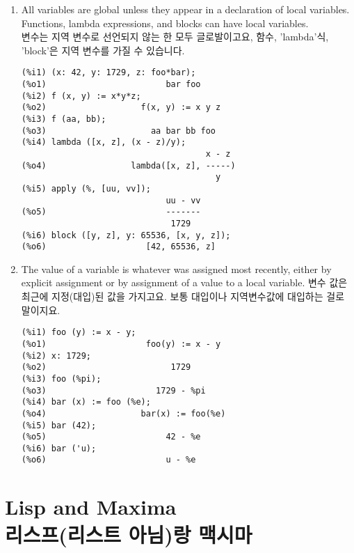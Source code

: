 \documentclass[12pt]{article}
\begin{document}
\begin{enumerate}

\item All variables are global unless they appear in a declaration of local variables.
Functions, lambda expressions, and blocks can have local variables. \\
변수는 지역 변수로 선언되지 않는 한 모두 글로발이고요,
함수, 'lambda'식, 'block'은 지역 변수를 가질 수 있습니다.


\begin{verbatim}
(%i1) (x: 42, y: 1729, z: foo*bar);
(%o1)                        bar foo
(%i2) f (x, y) := x*y*z;
(%o2)                   f(x, y) := x y z
(%i3) f (aa, bb);
(%o3)                     aa bar bb foo
(%i4) lambda ([x, z], (x - z)/y);
                                     x - z
(%o4)                 lambda([x, z], -----)
                                       y
(%i5) apply (%, [uu, vv]);
                             uu - vv
(%o5)                        -------
                              1729
(%i6) block ([y, z], y: 65536, [x, y, z]);
(%o6)                    [42, 65536, z]
\end{verbatim}

\item The value of a variable is whatever was assigned most recently,
either by explicit assignment or by assignment of a value to a local variable.
변수 값은 최근에 지정(대입)된 값을 가지고요. 보통 대입이나 
 지역변수값에 대입하는 걸로 말이지요.


\begin{verbatim}
(%i1) foo (y) := x - y;
(%o1)                    foo(y) := x - y
(%i2) x: 1729;
(%o2)                         1729
(%i3) foo (%pi);
(%o3)                      1729 - %pi
(%i4) bar (x) := foo (%e);
(%o4)                   bar(x) := foo(%e)
(%i5) bar (42);
(%o5)                        42 - %e
(%i6) bar ('u);
(%o6)                        u - %e
\end{verbatim}

\end{enumerate}

\section{Lisp and Maxima \\리스프(리스트 아님)랑 맥시마}
\end{document}
